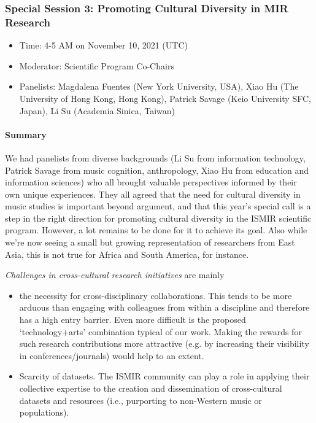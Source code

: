 \documentclass[%
10pt,								%
]
{scrartcl}
\begin{document}
        \subsubsection{Special Session 3: Promoting Cultural Diversity in MIR Research}
            \begin{itemize}
                \item   Time: 4-5 AM on November 10, 2021 (UTC)

                \item   Moderator: Scientific Program Co-Chairs

                \item   Panelists: Magdalena Fuentes (New York University, USA), Xiao Hu (The University of Hong Kong, Hong Kong), Patrick Savage (Keio University SFC, Japan), Li Su (Academia Sinica, Taiwan)


            \end{itemize}
            
            \paragraph{Summary}
                We had panelists from diverse backgrounds (Li Su from information technology, Patrick Savage from music cognition, anthropology, Xiao Hu from education and information sciences) who all brought valuable perspectives informed by their own unique experiences. They all agreed that the need for cultural diversity in music studies is important beyond argument, and that this year’s special call is a step in the right direction for promoting cultural diversity in the ISMIR scientific program. However, a lot remains to be done for it to achieve its goal. Also while we’re now seeing a small but growing representation of researchers from East Asia, this is not true for Africa and South America, for instance.
                
                \textit{Challenges in cross-cultural research initiatives} are mainly
                    \begin{itemize}
                        \item   the necessity for cross-disciplinary collaborations. This tends to be more arduous than engaging with colleagues from within a discipline and therefore has a high entry barrier. Even more difficult is the proposed ‘technology+arts’ combination typical of our work. Making the rewards for such research contributions more attractive (e.g. by increasing their visibility in conferences/journals) would help to an extent. 
                        \item   Scarcity of datasets. The ISMIR community can play a role in applying their collective expertise to the creation and dissemination of cross-cultural datasets and resources (i.e., purporting to non-Western music or populations). 
                    \end{itemize}
                
\end{document}
